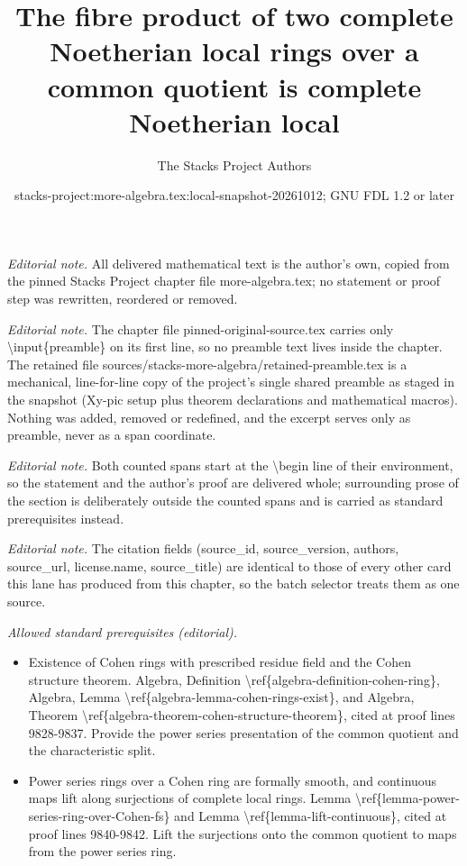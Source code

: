 \documentclass[10pt,a4paper]{amsart}
\title{The fibre product of two complete Noetherian local rings over a common quotient is complete Noetherian local}
\author{The Stacks Project Authors}
\date{stacks-project:more-algebra.tex:local-snapshot-20261012; GNU FDL 1.2 or later}
\theoremstyle{plain}
\theoremstyle{definition}
\theoremstyle{remark}
\numberwithin{equation}{subsection}
\begin{document}
\maketitle
\setcounter{subsection}{1}
\noindent\textit{Editorial note.} All delivered mathematical text is the author's own, copied from the pinned Stacks Project chapter file more-algebra.tex; no statement or proof step was rewritten, reordered or removed.\par\medskip
\noindent\textit{Editorial note.} The chapter file pinned-original-source.tex carries only \textbackslash{}input\{preamble\} on its first line, so no preamble text lives inside the chapter. The retained file sources/stacks-more-algebra/retained-preamble.tex is a mechanical, line-for-line copy of the project's single shared preamble as staged in the snapshot (Xy-pic setup plus theorem declarations and mathematical macros). Nothing was added, removed or redefined, and the excerpt serves only as preamble, never as a span coordinate.\par\medskip
\noindent\textit{Editorial note.} Both counted spans start at the \textbackslash{}begin line of their environment, so the statement and the author's proof are delivered whole; surrounding prose of the section is deliberately outside the counted spans and is carried as standard prerequisites instead.\par\medskip
\noindent\textit{Editorial note.} The citation fields (source\_id, source\_version, authors, source\_url, license.name, source\_title) are identical to those of every other card this lane has produced from this chapter, so the batch selector treats them as one source.\par\medskip
\noindent\textit{Allowed standard prerequisites (editorial).}\begin{itemize}
\item Existence of Cohen rings with prescribed residue field and the Cohen structure theorem. Algebra, Definition \textbackslash{}ref\{algebra-definition-cohen-ring\}, Algebra, Lemma \textbackslash{}ref\{algebra-lemma-cohen-rings-exist\}, and Algebra, Theorem \textbackslash{}ref\{algebra-theorem-cohen-structure-theorem\}, cited at proof lines 9828-9837. Provide the power series presentation of the common quotient and the characteristic split.
\item Power series rings over a Cohen ring are formally smooth, and continuous maps lift along surjections of complete local rings. Lemma \textbackslash{}ref\{lemma-power-series-ring-over-Cohen-fs\} and Lemma \textbackslash{}ref\{lemma-lift-continuous\}, cited at proof lines 9840-9842. Lift the surjections onto the common quotient to maps from the power series ring.
\end{itemize}\medskip
\end{document}
